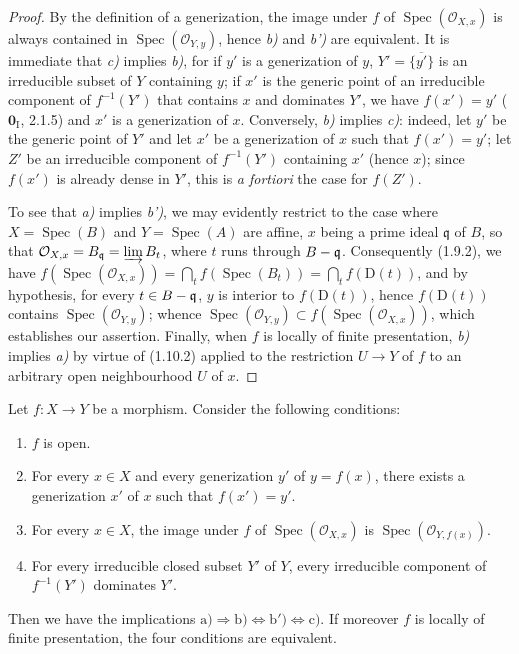 \begin{proof}
By the definition of a generization, the image under $f$ of
$\operatorname{Spec}(\mathcal O_{X,x})$ is always contained in
$\operatorname{Spec}(\mathcal O_{Y,y})$, hence \emph{b)} and \emph{b')} are equivalent. It
is immediate
that \emph{c)} implies \emph{b)}, for if $y'$ is a generization of $y$,
$Y'=\overline{\{y'\}}$ is an irreducible subset of $Y$ containing $y$; if
$x'$ is the generic point of an irreducible component of $f^{-1}(Y')$ that
contains $x$ and dominates $Y'$, we have $f(x')=y'$ ($\mathbf{0}_{\mathrm I}$, 2.1.5)
and $x'$ is a generization of $x$. Conversely, \emph{b)} implies \emph{c)}: indeed, let
$y'$ be the generic point of $Y'$ and let $x'$ be a generization of $x$ such
that $f(x')=y'$; let $Z'$ be an irreducible component of $f^{-1}(Y')$
containing $x'$ (hence $x$); since $f(x')$ is already dense in $Y'$, this is
\emph{a fortiori} the case for $f(Z')$.

To see that \emph{a)} implies \emph{b')}, we may evidently restrict to the case where
$X=\operatorname{Spec}(B)$ and $Y=\operatorname{Spec}(A)$ are affine, $x$
being a prime ideal
$\mathfrak q$ of $B$, so that
$\mathcal O_{X,x}=B_{\mathfrak q}=\varinjlim B_t$,
where $t$ runs through $B-\mathfrak q$. Consequently (1.9.2), we have $f(\operatorname{Spec}(\mathcal O_{X,x}))
=\bigcap_t f(\operatorname{Spec}(B_t))=\bigcap_t f(\mathrm D(t))$,
and by hypothesis, for every $t\in B-\mathfrak q$, $y$ is interior to
$f(\mathrm D(t))$, hence $f(\mathrm D(t))$ contains
$\operatorname{Spec}(\mathcal O_{Y,y})$; whence
$\operatorname{Spec}(\mathcal O_{Y,y})
\subset f(\operatorname{Spec}(\mathcal O_{X,x}))$, which establishes
our assertion. Finally, when $f$ is locally of finite presentation, \emph{b)}
implies \emph{a)} by virtue of (1.10.2) applied to the restriction $U\to Y$ of $f$
to an arbitrary open neighbourhood $U$ of $x$.
\end{proof}

\begin{corollary}[1.10.4]
\label{IV.1.10.4}
Let $f:X\to Y$ be a morphism. Consider the following conditions:
\begin{enumerate}
  \item[\textup{a)}] $f$ is open.
  \item[\textup{b)}] For every $x\in X$ and every generization $y'$ of $y=f(x)$, there
  exists a generization $x'$ of $x$ such that $f(x')=y'$.
  \item[\textup{b')}] For every $x\in X$, the image under $f$ of
  $\operatorname{Spec}(\mathcal O_{X,x})$ is
  $\operatorname{Spec}(\mathcal O_{Y,f(x)})$.
  \item[\textup{c)}] For every irreducible closed subset $Y'$ of $Y$, every
  irreducible component of $f^{-1}(Y')$ dominates $Y'$.
\end{enumerate}
Then we have the implications
$\mathrm{a)}\Rightarrow\mathrm{b)}\Leftrightarrow\mathrm{b')}
\Leftrightarrow\mathrm{c)}$. If moreover $f$ is locally of finite
presentation, the four conditions are equivalent.
\end{corollary}

